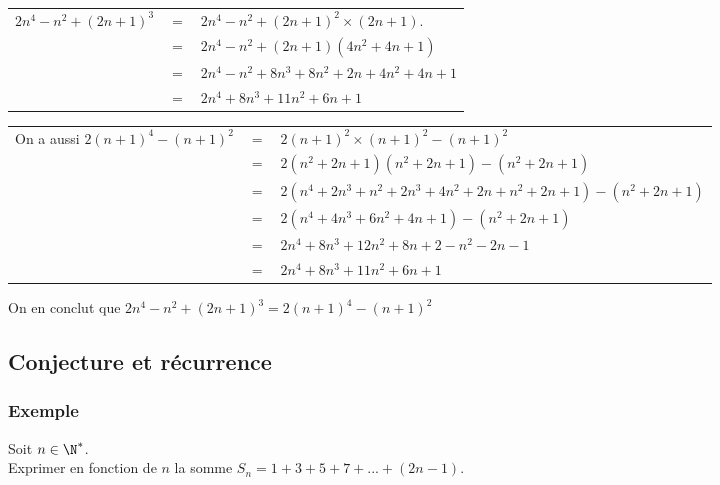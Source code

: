 \newpage

\begin{tabular}{lll}
$2n^4 - n^2 + \left(2n+1\right)^3$ & $=$ & $2n^4 - n^2 + \left(2n+1\right)^2 \times \left(2n+1\right)$. \\
& $=$ & $2n^4 -n^2 + \left(2n+1\right)\left(4n^2 + 4n + 1\right)$ \\
& $=$ & $2n^4 - n^2 + 8n^3 + 8n^2 + 2n + 4n^2 + 4n + 1$ \\
& $=$ & $2n^4 + 8n^3 + 11n^2 + 6n + 1$ \\
\end{tabular}

\vspace*{.3cm}

\begin{tabular}{lll}
On a aussi $2\left(n+1\right)^4 - \left(n+1\right)^2$ & $ =$ &$ 2\left(n+1\right)^2\times\left(n+1\right)^2 - \left(n+1\right)^2$ \\
& $=$ & $2\left(n^2 + 2n + 1\right)\left(n^2 + 2n + 1\right) - \left(n^2 + 2n + 1\right)$ \\
& $=$ & $2\left(n^4 + 2n^3 + n^2 + 2n^3 + 4n^2 + 2n + n^2 + 2n + 1\right)-\left(n^2 + 2n + 1\right)$ \\
& $=$ & $2\left(n^4 + 4n^3 + 6n^2 + 4n + 1\right)-\left(n^2 + 2n + 1\right)$ \\
& $=$ & $2n^4 + 8n^3 + 12n^2 + 8n + 2 - n^2 - 2n - 1$ \\
& $=$ & $2n^4 + 8n^3 + 11n^2 + 6n + 1$ \\
\end{tabular}

\vspace*{.3cm}

On en conclut que $2n^4 - n^2 + \left(2n+1\right)^3 = 2\left(n+1\right)^4 - \left(n+1\right)^2$

\subsection{Conjecture et récurrence}

\subsubsection{Exemple }

Soit $n \in \N^*$. \\

Exprimer en fonction de $n$ la somme $S_n = 1 + 3 + 5 + 7 + ... + \left(2n -1\right)$. \\

